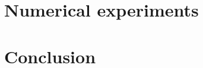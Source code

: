 \documentclass[review]{elsarticle}
\begin{document}
\section{Numerical experiments}\label{Numerical experiments}


\section{Conclusion}\label{Conclusion}





\end{document}
